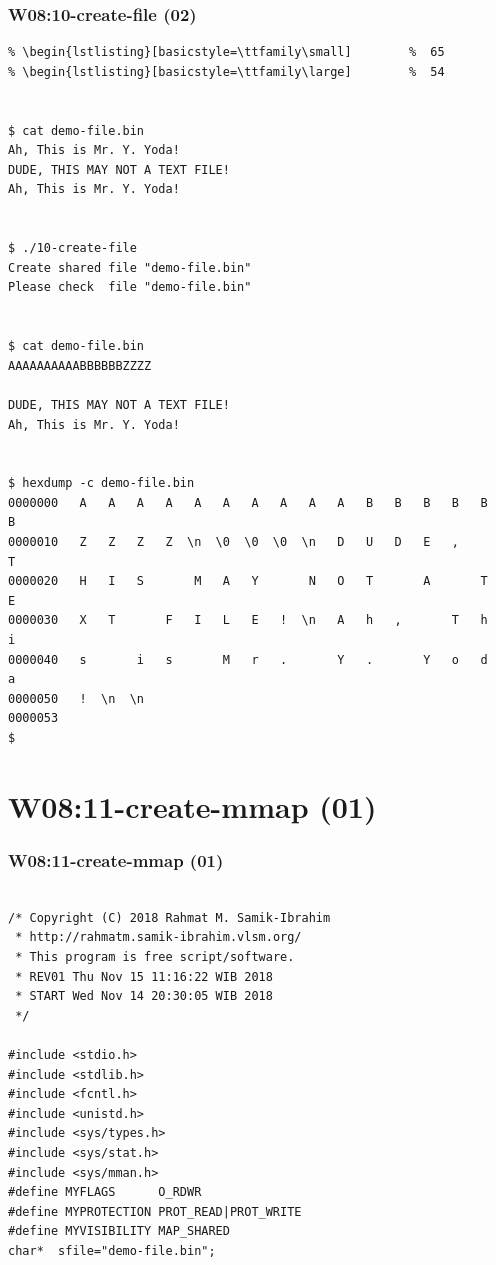 \documentclass[aspectratio=169, xcolor=table, notheorems, hyperref={pdfpagelabels=false}]{beamer}
\begin{document}
\begin{frame}[fragile]
\frametitle{W08:10-create-file (02)}
\begin{lstlisting}[basicstyle=\ttfamily\tiny]         % 108
% \begin{lstlisting}[basicstyle=\ttfamily\footnotesize] %  72
% \begin{lstlisting}[basicstyle=\ttfamily\small]        %  65
% \begin{lstlisting}[basicstyle=\ttfamily\large]        %  54


$ cat demo-file.bin 
Ah, This is Mr. Y. Yoda!
DUDE, THIS MAY NOT A TEXT FILE!
Ah, This is Mr. Y. Yoda!


$ ./10-create-file 
Create shared file "demo-file.bin"
Please check  file "demo-file.bin"


$ cat demo-file.bin 
AAAAAAAAAABBBBBBZZZZ

DUDE, THIS MAY NOT A TEXT FILE!
Ah, This is Mr. Y. Yoda!


$ hexdump -c demo-file.bin 
0000000   A   A   A   A   A   A   A   A   A   A   B   B   B   B   B   B
0000010   Z   Z   Z   Z  \n  \0  \0  \0  \n   D   U   D   E   ,       T
0000020   H   I   S       M   A   Y       N   O   T       A       T   E
0000030   X   T       F   I   L   E   !  \n   A   h   ,       T   h   i
0000040   s       i   s       M   r   .       Y   .       Y   o   d   a
0000050   !  \n  \n                                                    
0000053
$ 

\end{lstlisting}
\end{frame}

\section{W08:11-create-mmap (01)}
\begin{frame}[fragile]
\frametitle{W08:11-create-mmap (01)}
\begin{lstlisting}[basicstyle=\ttfamily\small]        %  65
% \begin{lstlisting}[basicstyle=\ttfamily\large]        %  54

/* Copyright (C) 2018 Rahmat M. Samik-Ibrahim 
 * http://rahmatm.samik-ibrahim.vlsm.org/
 * This program is free script/software.
 * REV01 Thu Nov 15 11:16:22 WIB 2018
 * START Wed Nov 14 20:30:05 WIB 2018
 */

#include <stdio.h>
#include <stdlib.h>
#include <fcntl.h>
#include <unistd.h>
#include <sys/types.h>
#include <sys/stat.h>
#include <sys/mman.h>
#define MYFLAGS      O_RDWR
#define MYPROTECTION PROT_READ|PROT_WRITE
#define MYVISIBILITY MAP_SHARED
char*  sfile="demo-file.bin";

\end{lstlisting}
\end{frame}
\end{document}
